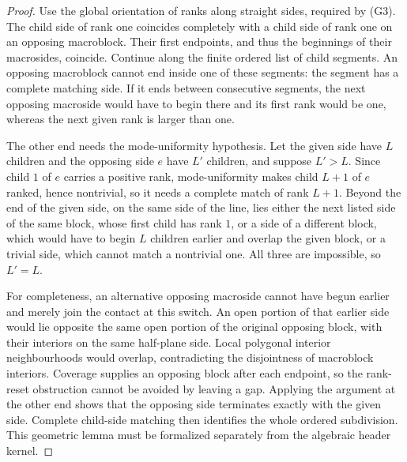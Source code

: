\begin{proof}
Use the global orientation of ranks along straight sides, required by (G3).
The child side
of rank one coincides completely with a child side of rank one on an
opposing macroblock. Their first endpoints, and thus the beginnings of
their macrosides, coincide. Continue along the finite ordered list of child
segments. An opposing macroblock cannot end inside one of these segments:
the segment has a complete matching side. If it ends between consecutive
segments, the next opposing macroside would have to begin there and its
first rank would be one, whereas the next given rank is larger than one.

The other end needs the mode-uniformity hypothesis. Let the given side
have $L$ children and the opposing side $e$ have $L'$ children, and suppose
$L'>L$. Since child $1$ of $e$ carries a positive rank, mode-uniformity
makes child $L+1$ of $e$ ranked, hence nontrivial, so it needs a complete
match of rank $L+1$. Beyond the end of the given side, on the same side of
the line, lies either the next listed side of the same block, whose first
child has rank $1$, or a side of a different block, which would have to
begin $L$ children earlier and overlap the given block, or a trivial side,
which cannot match a nontrivial one. All three are impossible, so $L'=L$.

For completeness, an alternative opposing macroside cannot have begun
earlier and merely join the contact at this switch. An open portion of that
earlier side would lie opposite the same open portion of the original
opposing block, with their interiors on the same half-plane side. Local
polygonal interior neighbourhoods would overlap, contradicting the
disjointness of macroblock interiors. Coverage supplies an opposing block
after each endpoint, so the rank-reset obstruction cannot be avoided by
leaving a gap. Applying the argument at the other end shows that the
opposing side terminates exactly with the given side. Complete child-side
matching then identifies the whole ordered subdivision. This geometric
lemma must be formalized separately from the algebraic header kernel.
\end{proof}

